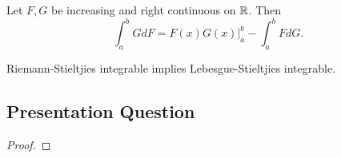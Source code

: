 \documentclass[class=book, crop=false]{standalone}
\begin{document}
        \begin{theorem}
            Let $F, G$ be increasing and right continuous on $\mathbb{R}$. Then
            \begin{equation*}
                \int^b_a G dF = F(x) G(x) \bigg|^b_a - \int^b_a F dG.
            \end{equation*}
        \end{theorem}
        
        \begin{remark}
            Riemann-Stieltjies integrable implies Lebesgue-Stieltjies integrable.
        \end{remark}
        
        \subsection{Presentation Question}
        \begin{question}
            
        \end{question}
        \begin{proof}
            
        \end{proof}
\end{document}
